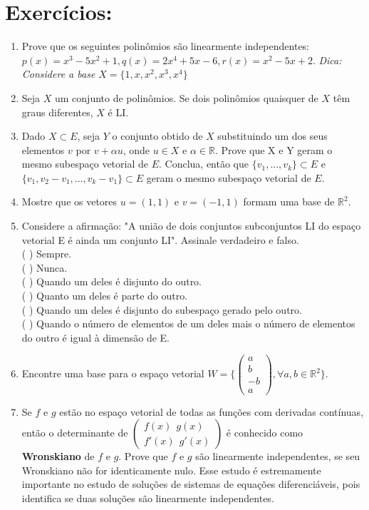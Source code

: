 \documentclass[12pt,letterpaper]{article}
\begin{document}
\section*{Exercícios: }
\begin{enumerate}
    \item Prove que os seguintes polinômios são linearmente independentes: $p(x) = x^3 - 5x^2 + 1, q(x) = 2x^4 + 5x - 6, r(x) = x^2 - 5x + 2$. 
    \textit{Dica: Considere a base $X = \{1, x, x^2, x^3, x^4\}$} 
    \item Seja $X$ um conjunto de polinômios.  Se dois polinômios quaisquer de $X$ têm graus diferentes, $X$ é LI.
    \item Dado $X \subset E $, seja $Y$ o conjunto obtido de $X$ substituindo um dos seus elementos $v$ por $v + \alpha u$, onde $u \in X$ e $\alpha \in \mathbb{R} $. Prove que X e Y geram o mesmo subespaço vetorial de $E$. Conclua, então que $\{v_1,...,v_k\} \subset E$ e $\{v_1, v_2 - v_1, ..., v_k - v_1\} \subset E $ geram o mesmo subespaço vetorial de $E$.
    \item Mostre que os vetores $u = (1,1)$ e $v = (-1,1)$ formam uma base de $\mathbb{R}^2$. 
    \item Considere a afirmação: "A união de dois conjuntos subconjuntos LI do espaço vetorial E é ainda um conjunto LI". Assinale verdadeiro e falso. \\
    (  ) Sempre.\\
    (  ) Nunca. \\
    (  ) Quando um deles é disjunto do outro. \\
    (  ) Quanto um deles é parte do outro. \\
    (  ) Quando um deles é disjunto do subespaço gerado pelo outro. \\ 
    (  ) Quando o número de elementos de um deles mais o número de elementos do outro é igual à dimensão de E.
    \item Encontre uma base para o espaço vetorial $W = \{\begin{pmatrix}a \\ b \\ -b \\ a\end{pmatrix}, \forall a,b \in \mathbb{R}^2\}$. 
    \item Se $f$ e $g$ estão no espaço vetorial de todas as funções com derivadas contínuas, então o determinante de $\begin{pmatrix} f(x) ~~ g(x) \\ f'(x) ~~ g'(x) \end{pmatrix}$ é conhecido como \textbf{Wronskiano} de $f$ e $g$. Prove que $f$ e $g$ são linearmente independentes, se seu Wronskiano não for identicamente nulo. Esse estudo é estremamente importante no estudo de soluções de sistemas de equações diferenciáveis, pois identifica se duas soluções são linearmente independentes.   
\end{enumerate}
\end{document}
